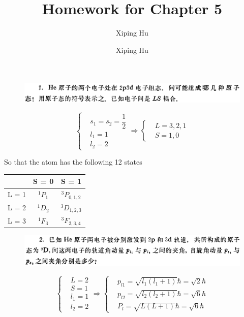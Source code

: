 \documentclass{article}
\author{Xiping Hu}
\author{Xiping Hu}
\affil{https://hxp.plus/}
\title{Homework for Chapter 5}
\begin{document}
\maketitle

\begin{figure}[H]
  \centering
  \includegraphics[width=\linewidth]{figures/Problem1}
  \label{fig:}
\end{figure}

\begin{equation*}
  \left\{
  \begin{aligned}
    & s_1 = s_2 = \dfrac{1}{2} \\
    & l_1 = 1 \\
    & l_2 = 2
  \end{aligned}
  \right.
  \Rightarrow
  \left\{
  \begin{aligned}
    & L = 3, 2, 1 \\
    & S = 1, 0
  \end{aligned}
  \right.
\end{equation*}

So that the atom has the following 12 states

\begin{center}
\begin{tabular}{ c|cc } 
        & S = 0 & S = 1 \\
  \hline
  L = 1 & ${}^{1}P_{1}$ & ${}^{3}P_{0,1,2}$ \\ 
  L = 2 & ${}^{1}D_{2}$ & ${}^{3}D_{1,2,3}$ \\
  L = 3 & ${}^{1}F_{3}$ & ${}^{3}F_{2,3,4}$ \\
\end{tabular}
\end{center}

\begin{figure}[H]
  \centering
  \includegraphics[width=\linewidth]{figures/Problem2}
  \label{fig:}
\end{figure}

\begin{equation*}
  \left\{
    \begin{aligned}
      & L = 2 \\
      & S = 1 \\
      & l_1 = 1 \\
      & l_2 = 2
    \end{aligned}
  \right.
  \Rightarrow
 \left\{
    \begin{aligned}
      & p_{l1} = \sqrt{l_1 \left( l_1 + 1 \right)} \hbar  = \sqrt{2} \hbar \\
      & p_{l2} = \sqrt{l_2 \left( l_2 + 1 \right)} \hbar = \sqrt{6} \hbar \\
      & P_l = \sqrt{L \left( L + 1 \right)} \hbar = \sqrt{6} \hbar
    \end{aligned}
  \right.
\end{equation*}
\end{document}
